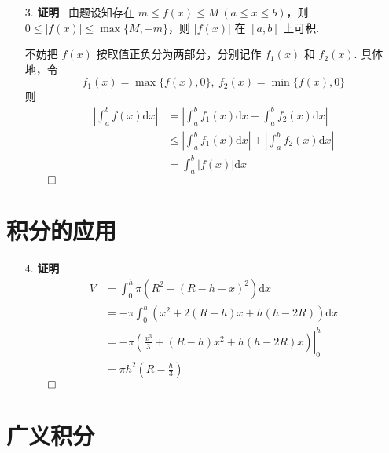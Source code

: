 \documentclass[11pt,oneside,fontset=fandol]{ctexbook} %
\begin{document}
\begin{enumerate}
    \item[3.]
    \textbf{证明} \ 由题设知存在 $m \leqslant f(x) \leqslant M \ (a \leqslant x \leqslant b)$，则 $0 \leqslant |f(x)| \leqslant \max\{ M, -m \}$，则 $|f(x)|$ 在 $[a, b]$ 上可积.
    
    不妨把 $f(x)$ 按取值正负分为两部分，分别记作 $f_1(x)$ 和 $f_2(x)$. 具体地，令
    \[
        f_1(x) = \max\{ f(x), 0 \},\ f_2(x) = \min\{ f(x), 0 \}
    \]
    则
    \begin{align*}
        \left| \int_a^b f(x) \mathrm dx \right| &= \left| \int_a^b f_1(x) \mathrm dx + \int_a^b f_2(x) \mathrm dx \right| \\ &\leqslant \left| \int_a^b f_1(x) \mathrm dx \right| + \left| \int_a^b f_2(x) \mathrm dx \right| \\
        &= \int_a^b |f(x)| \mathrm dx
    \end{align*}
    $\hfill\qed$
\end{enumerate}

\section{积分的应用}

\begin{enumerate}
    \item[4.]
    \textbf{证明}
    \begin{align*}
        V &= \int_0^h \pi \left( R^2 - (R-h+x)^2 \right) \mathrm dx \\
        &= -\pi \int_0^h \left( x^2 + 2 (R-h) x + h (h-2R) \right) \mathrm dx \\
        &= \left. -\pi \left( \frac {x^3} 3 + (R-h) x^2 +  h(h-2R)x \right) \right|_0^h \\
        &= \pi h^2 (R - \frac h 3)
    \end{align*}
    $\hfill\qed$
\end{enumerate}

\section{广义积分}
\end{document}

